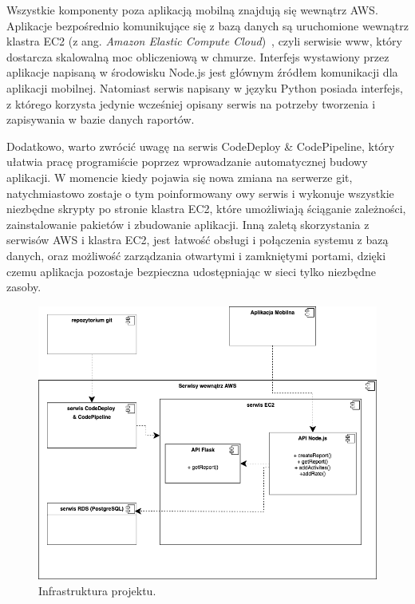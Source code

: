 \documentclass[a4paper,twoside,12pt]{book}
\newcommand{\obcy}[1]{\emph{#1}}
\newcommand{\ang}[1]{{\selectlanguage{british}\obcy{#1}}}
\begin{document}
Wszystkie komponenty poza aplikacją mobilną znajdują się wewnątrz AWS. Aplikacje bezpośrednio komunikujące się z bazą danych są uruchomione wewnątrz klastra EC2 (z ang. \ang{Amazon Elastic Compute Cloud})~\cite{ec2}, czyli serwisie www, który dostarcza skalowalną moc obliczeniową w chmurze. Interfejs wystawiony przez aplikacje napisaną w środowisku Node.js jest głównym źródłem komunikacji dla aplikacji mobilnej. Natomiast serwis napisany w języku Python posiada interfejs, z którego korzysta jedynie wcześniej opisany serwis na potrzeby tworzenia i zapisywania w bazie danych raportów. 

Dodatkowo, warto zwrócić uwagę na serwis CodeDeploy \& CodePipeline, który ułatwia pracę programiście poprzez wprowadzanie automatycznej budowy aplikacji. W momencie kiedy pojawia się nowa zmiana na serwerze git, natychmiastowo zostaje o tym poinformowany owy serwis i wykonuje wszystkie niezbędne skrypty po stronie klastra EC2, które umożliwiają ściąganie zależności, zainstalowanie pakietów i zbudowanie aplikacji. Inną zaletą skorzystania z serwisów AWS i klastra EC2, jest łatwość obsługi i połączenia systemu z bazą danych, oraz możliwość zarządzania otwartymi i zamkniętymi portami, dzięki czemu aplikacja pozostaje bezpieczna udostępniając w sieci tylko niezbędne zasoby.      

\begin{figure}[h!]
    \centering
    \includegraphics[width=\textwidth]{images/general_diagram_track_apps.png}
    \caption{Infrastruktura projektu.}
    \label{fig:general}
\end{figure}
\end{document}
